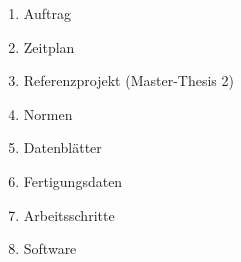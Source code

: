 \begin{enumerate}
	\item Auftrag 
	\vspace{3mm}  
	\item Zeitplan
	\vspace{3mm} 
	\item Referenzprojekt (Master-Thesis 2)
	\vspace{3mm} 
	\item Normen
	\vspace{3mm} 
	\item Datenblätter
	\vspace{3mm} 
	\item Fertigungsdaten
	\vspace{3mm} 
	\item Arbeitsschritte 
	\vspace{3mm} 
	\item Software
\end{enumerate}